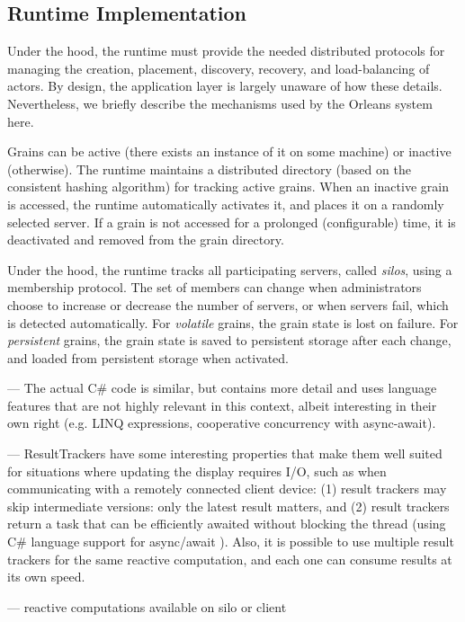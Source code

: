 \hidden
{
\subsection{Runtime Implementation}

Under the hood, the runtime must provide the needed distributed protocols for managing the creation, placement, discovery, recovery, and load-balancing of actors. By design, the application layer is largely unaware of how these details. Nevertheless, we briefly describe the mechanisms used by the Orleans system here. 

 Grains can be active (there exists an instance of it on some machine) or inactive (otherwise). The runtime maintains a distributed directory (based on the consistent hashing algorithm)  for tracking active grains. When an inactive grain is accessed, the runtime automatically activates it, and places it on a randomly selected server. If a grain is not accessed for a prolonged (configurable) time, it is deactivated and removed from the grain directory. 

 Under the hood, the runtime tracks all participating servers, called \emph{silos}, using a membership protocol. The set of members can change when administrators choose to increase or decrease the number of servers, or when servers fail, which is detected automatically.  For \emph{volatile} grains, the grain state is lost on failure. For \emph{persistent} grains, the grain state is saved to persistent storage after each change, and loaded from persistent storage when activated. 
 

--- The actual C\# code is similar, but contains more detail and uses language features that are not highly relevant in this context, albeit interesting in their own right (e.g. LINQ expressions, cooperative concurrency with async-await).

--- ResultTrackers have some interesting properties that make them well suited for situations where updating the display requires I/O, such as when communicating with a remotely connected client device:   (1) result trackers may skip intermediate versions: only the latest result matters, and (2) result trackers return a task that can be efficiently awaited without blocking the thread (using C\# language support for async/await \cite{Bierman2012}).  Also, it is possible to use multiple result trackers for the same reactive computation, and each one can consume results at its own speed.

--- reactive computations available on silo or client
}

